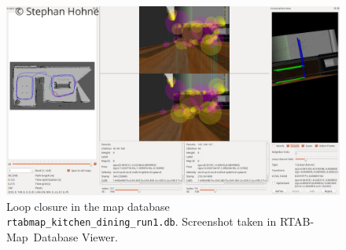 \documentclass[10pt, journal, compsoc]{IEEEtran}
\newcommand{\rtab}{RTAB-Map}
\begin{document}
\begin{figure}[thpb]
      \centering
      \includegraphics[width=\textwidth]{images/loop_closure_1.jpg}
      \caption{Loop closure in the map database \texttt{rtabmap\_kitchen\_dining\_run1.db}. Screenshot taken in \rtab\ Database Viewer.}
      \label{fig:loop_closure_1}
\end{figure}
\end{document}
